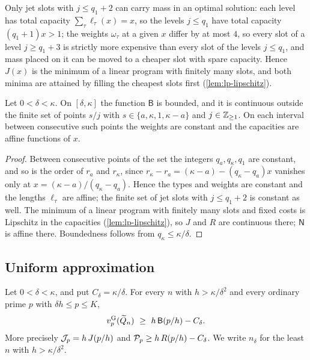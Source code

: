 Only jet slots with $j\le q_1+2$ can carry mass in an optimal solution: each level has total capacity $\sum_\tau\ell_\tau(x)=x$, so the levels $j\le q_1$ have total capacity $(q_1+1)x>1$; the weights $\omega_\tau$ at a given $x$ differ by at most $4$, so every slot of a level $j\ge q_1+3$ is strictly more expensive than every slot of the levels $j\le q_1$, and mass placed on it can be moved to a cheaper slot with spare capacity. Hence $J(x)$ is the minimum of a linear program with finitely many slots, and both minima are attained by filling the cheapest slots first (\cref{lem:lp-lipschitz}).

\begin{lemma}\label{lem:profile-regular}
Let $0<\delta<\kappa$. On $[\delta,\kappa]$ the function $\mathsf B$ is bounded, and it is continuous outside the finite set of points $s/j$ with $s\in\{a,\kappa,1,\kappa-a\}$ and $j\in\mathbb{Z}_{\ge1}$. On each interval between consecutive such points the weights are constant and the capacities are affine functions of $x$.
\end{lemma}

\begin{proof}
Between consecutive points of the set the integers $q_a,q_\kappa,q_1$ are constant, and so is the order of $r_a$ and $r_\kappa$, since $r_\kappa-r_a=(\kappa-a)-(q_\kappa-q_a)x$ vanishes only at $x=(\kappa-a)/(q_\kappa-q_a)$. Hence the types and weights are constant and the lengths $\ell_\tau$ are affine; the finite set of jet slots with $j\le q_1+2$ is constant as well. The minimum of a linear program with finitely many slots and fixed costs is Lipschitz in the capacities (\cref{lem:lp-lipschitz}), so $J$ and $R$ are continuous there; $\mathsf N$ is affine there. Boundedness follows from $q_\kappa\le\kappa/\delta$.
\end{proof}

\subsection{Uniform approximation}\label{sec:uniform}

\begin{proposition}\label{prop:profile-uniform}
Let $0<\delta<\kappa$, and put $C_\delta=\kappa/\delta$. For every $n$ with $h>\kappa/\delta^2$ and every ordinary prime $p$ with $\delta h\le p\le K$,
\[
v^{\mathrm{G}}_{p}(\widetilde{Q}_n)\ \ge\ h\,\mathsf B(p/h)-C_\delta .
\]
More precisely $\mathcal{J}_p=h\,J(p/h)$ and $\mathcal{P}_p\ge h\,R(p/h)-C_\delta$. We write $n_\delta$ for the least $n$ with $h>\kappa/\delta^2$.
\end{proposition}

